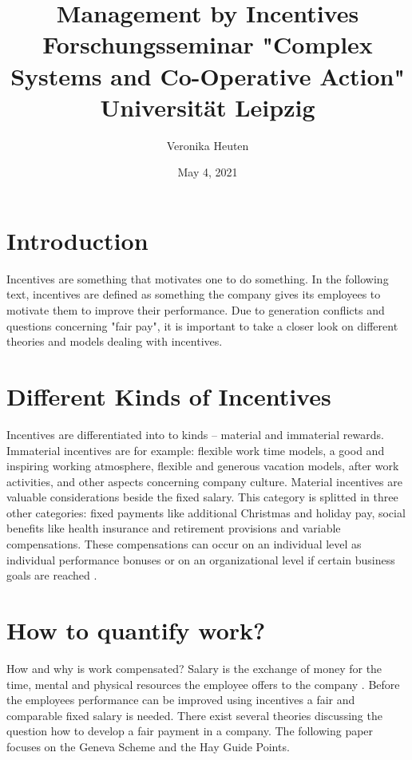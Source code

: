 \documentclass[11pt,a4paper]{article}
\title{Management by Incentives  \\[1em] \normalsize
  Forschungsseminar "Complex Systems and Co-Operative Action"\\ 
Universität Leipzig}
\author{Veronika Heuten}
\date{May 4, 2021}
\begin{document}
\maketitle

\section{Introduction}
Incentives are something that motivates one to do something. In the following
text, incentives are defined as something the company gives its employees to
motivate them to improve their performance. Due to generation conflicts and
questions concerning "fair pay", it is important to take a closer look on
different theories and models dealing with incentives.

\section{Different Kinds of Incentives}
Incentives are differentiated into to kinds -- material and immaterial
rewards.  Immaterial incentives are for example: flexible work time models, a
good and inspiring working atmosphere, flexible and generous vacation models,
after work activities, and other aspects concerning company culture. Material
incentives are valuable considerations beside the fixed salary. This category
is splitted in three other categories: fixed payments like additional
Christmas and holiday pay, social benefits like health insurance and
retirement provisions and variable compensations. These compensations can
occur on an individual level as individual performance bonuses or on an
organizational level if certain business goals are reached \cite{HOLTB}.

\section{How to quantify work?}
How and why is work compensated? Salary is the exchange of money for the time,
mental and physical resources the employee offers to the company \cite{HOLTB}.
Before the employees performance can be improved using incentives a fair and
comparable fixed salary is needed. There exist several theories discussing the
question how to develop a fair payment in a company. The following paper
focuses on the Geneva Scheme and the Hay Guide Points.
\end{document}
